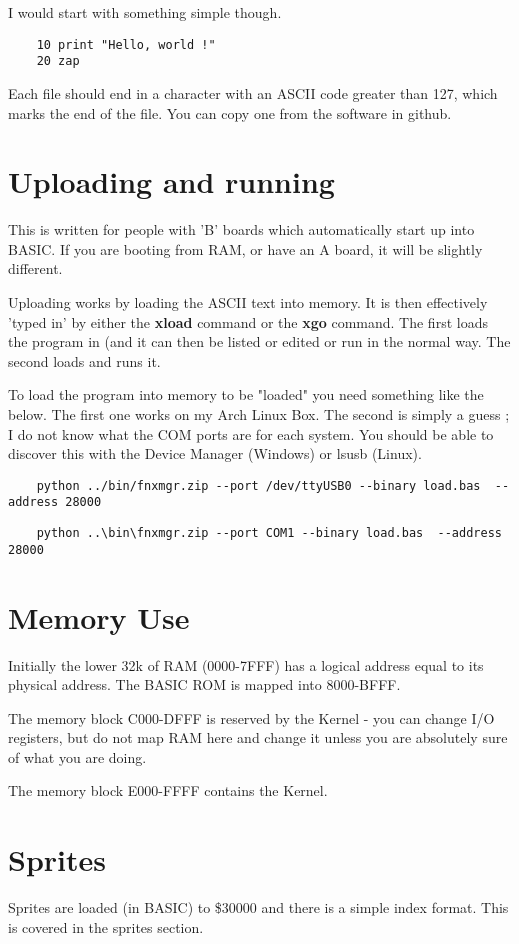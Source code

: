 I would start with something simple though.

\begin{verbatim}
	10 print "Hello, world !"
	20 zap
\end{verbatim}

Each file should end in a character with an ASCII code greater than 127, which marks the end of the file.  You can copy one from the software in github.

\section{Uploading and running}

This is written for people with 'B' boards which automatically start up into BASIC. If you are booting from RAM, or have an A board, it will be slightly different.

Uploading works by loading the ASCII text into memory. It is then effectively 'typed in' by either the \textbf{xload} command or the \textbf{xgo} command. The first loads the program in (and it can then be listed or edited or run in the normal way. The second loads and runs it.

To load the program into memory to be "loaded" you need something like the below. The first one works on my Arch Linux Box. The second is simply a guess ; I do not know what the COM ports are for each system. You should be able to discover this with the Device Manager (Windows) or lsusb (Linux).

\begin{verbatim}
	python ../bin/fnxmgr.zip --port /dev/ttyUSB0 --binary load.bas  --address 28000
\end{verbatim}

\begin{verbatim}
	python ..\bin\fnxmgr.zip --port COM1 --binary load.bas  --address 28000
\end{verbatim}

\section{Memory Use}

Initially the lower 32k of RAM (0000-7FFF) has a logical address equal to its physical address. The BASIC ROM is mapped into 8000-BFFF. 

The memory block C000-DFFF is reserved by the Kernel - you can change I/O registers, but do not map RAM here and change it unless you are absolutely sure of what you are doing.

The memory block E000-FFFF contains the Kernel.

\section{Sprites}
Sprites are loaded (in BASIC) to \$30000 and there is a simple index format. This is covered in the sprites section.
